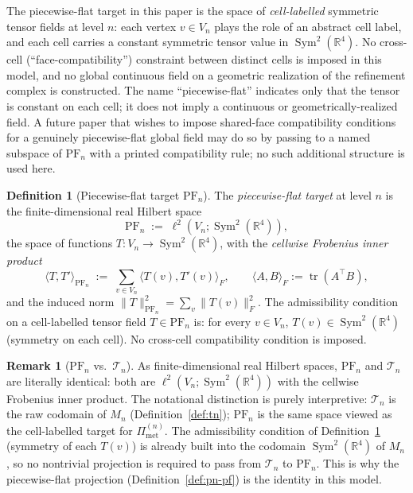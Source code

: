 \documentclass[11pt, a4paper]{amsart}
\theoremstyle{definition}
\newtheorem{definition}[theorem]{Definition}
\newtheorem{remark}[theorem]{Remark}
\newcommand{\R}{\mathbb{R}}
\newcommand{\tr}{\operatorname{tr}}
\newcommand{\Sym}{\operatorname{Sym}}
\newcommand{\Met}{\mathrm{met}}
\newcommand{\PF}{\mathrm{PF}}
\newcommand{\Pimet}{\Pi_{\Met}}
\begin{document}
The piecewise-flat target in this paper is the space of
\emph{cell-labelled} symmetric tensor fields at level $n$: each
vertex $v \in V_n$ plays the role of an abstract cell label, and
each cell carries a constant symmetric tensor value in
$\Sym^2(\R^4)$. No cross-cell (``face-compatibility'') constraint
between distinct cells is imposed in this model, and no global
continuous field on a geometric realization of the refinement
complex is constructed. The name ``piecewise-flat'' indicates
only that the tensor is constant on each cell; it does not imply
a continuous or geometrically-realized field. A future paper
that wishes to impose shared-face compatibility conditions for a
genuinely piecewise-flat global field may do so by passing to a
named subspace of $\PF_n$ with a printed compatibility rule; no
such additional structure is used here.

\begin{definition}[Piecewise-flat target $\PF_n$]
\label{def:pfn}
The \emph{piecewise-flat target} at level $n$ is the
finite-dimensional real Hilbert space
\[
  \PF_n \;:=\; \ell^2(V_n;\Sym^2(\R^4)),
\]
the space of functions $T \colon V_n \to \Sym^2(\R^4)$, with the
\emph{cellwise Frobenius inner product}
\[
  \langle T, T' \rangle_{\PF_n}
    \;:=\; \sum_{v \in V_n} \langle T(v), T'(v) \rangle_F,
  \qquad \langle A, B \rangle_F := \tr(A^\top B),
\]
and the induced norm
$\|T\|_{\PF_n}^2 = \sum_v \|T(v)\|_F^2$. The admissibility
condition on a cell-labelled tensor field $T \in \PF_n$ is: for
every $v \in V_n$, $T(v) \in \Sym^2(\R^4)$ (symmetry on each
cell). No cross-cell compatibility condition is imposed.
\end{definition}

\begin{remark}[$\PF_n$ vs.\ $\mathcal T_n$]
\label{rmk:pfn-vs-tn}
As finite-dimensional real Hilbert spaces, $\PF_n$ and
$\mathcal T_n$ are literally identical: both are
$\ell^2(V_n;\Sym^2(\R^4))$ with the cellwise Frobenius inner
product. The notational distinction is purely interpretive:
$\mathcal T_n$ is the raw codomain of $M_n$
(Definition~\ref{def:tn}); $\PF_n$ is the same space viewed as
the cell-labelled target for $\Pimet^{(n)}$. The admissibility
condition of Definition~\ref{def:pfn} (symmetry of each $T(v)$)
is already built into the codomain $\Sym^2(\R^4)$ of $M_n$, so
no nontrivial projection is required to pass from $\mathcal T_n$
to $\PF_n$. This is why the piecewise-flat projection
(Definition~\ref{def:pn-pf}) is the identity in this model.
\end{remark}
\end{document}
